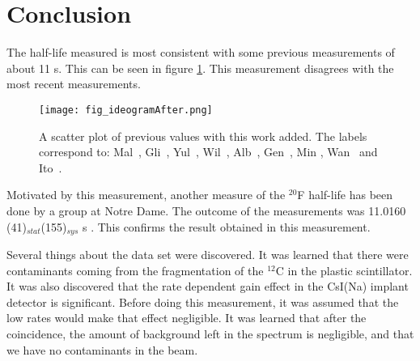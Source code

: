 \documentclass[MaxHughesThesis.tex]{subfiles}
\begin{document}
\section{Conclusion}
\label{sec:conclusion}

The half-life measured is most consistent with some previous measurements of about 11 s. 
This can be seen in figure \ref{fig:ideogramfinal}.
This measurement disagrees with the most recent measurements.

\begin{figure}[!htb]
\centerline{\texttt{[image: fig\_ideogramAfter.png]}}
\caption{A scatter plot of previous values with this work added.
	 The labels correspond to: Mal~\cite{Mal62}, Gli~\cite{Gli63},
	Yul~\cite{Yul67}, Wil~\cite{Wil70}, Alb~\cite{Alb75}, Gen~\cite{Gen76},
	Min \cite{Min87}, Wan~\cite{Wan92} and Ito~\cite{Ito95}.}
\label{fig:ideogramfinal}
\end{figure}

Motivated by this measurement, another measure of the $^{20}$F half-life has been done by a group at Notre Dame. 
The outcome of the measurements was 11.0160 (41)$_{stat}$(155)$_{sys}$ s \cite{Bur19}.
This confirms the result obtained in this measurement.

Several things about the data set were discovered.
It was learned that there were contaminants coming from the fragmentation of the $^{12}$C in the plastic scintillator.
It was also discovered that the rate dependent gain effect in the CsI(Na) implant detector is significant.
Before doing this measurement, it was assumed that the low rates would make that effect negligible.
It was learned that after the coincidence, the amount of background left in the spectrum is negligible, and that we have no contaminants in the beam.
\end{document}
